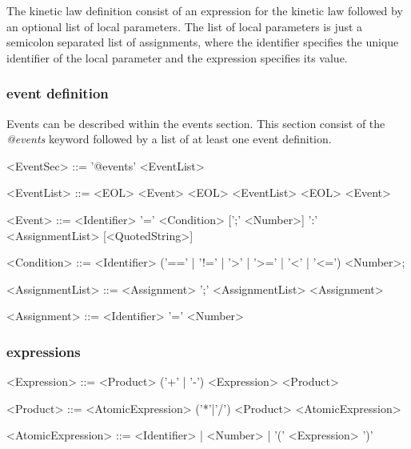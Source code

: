 \documentclass[a4paper]{article}
\begin{document}
The kinetic law definition consist of an expression for the kinetic law followed by an optional list of local parameters. The list of local parameters is just a semicolon separated list of assignments, where the identifier specifies the unique identifier of the local parameter and the expression specifies its value.

\subsubsection*{event definition}
Events can be described within the events section. This section consist of the \emph{@events} keyword followed by a list of at least one event definition. 
\begin{table} [h!]
\begin{grammar}
<EventSec> ::= '@events' <EventList>

<EventList> ::= <EOL> <Event> <EOL> <EventList>
  \alt <EOL> <Event>
  
<Event> ::= <Identifier> '=' <Condition> [';' <Number>] ':' <AssignmentList> [<QuotedString>]

<Condition> ::= <Identifier> ('==' | '!=' | '>' | '>=' | '<' | '<=') <Number>;

<AssignmentList> ::= <Assignment> ';' <AssignmentList>
  \alt <Assignment>
  
<Assignment> ::= <Identifier> '=' <Number>
\end{grammar}
\end{table}


\subsubsection*{expressions}
\begin{table}[h!]
\begin{grammar}
<Expression> ::= <Product> ('+' | '-') <Expression>
 \alt <Product>
 
<Product> ::= <AtomicExpression> ('*'|'/') <Product>
  \alt <AtomicExpression>
  
<AtomicExpression> ::= <Identifier> | <Number> | '(' <Expression> ')'
\end{grammar}
\end{table}
\end{document}
